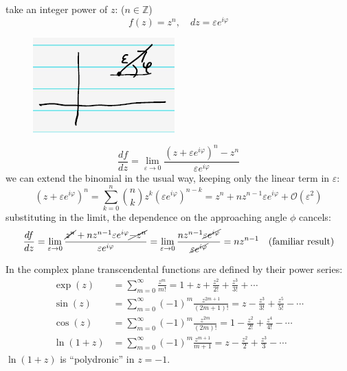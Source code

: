 \documentclass{article}
\begin{document}
\noindent
take an integer power of $z$: ($n \in \mathbb{Z}$)
\begin{equation}
    f(z) = z^n , \quad dz = \varepsilon e^{i \varphi}
\end{equation}
\begin{figure}[h]
    \centering
    \includegraphics[width=0.25\linewidth]{fig11.png}
\end{figure}
\begin{equation}
    \frac{d f}{d z}
= \lim_{\varepsilon \to 0} \frac{(z + \varepsilon e^{i\varphi})^n - z^n}{\varepsilon e^{i\varphi}}
\end{equation}
we can extend the binomial in the usual way, keeping only the linear term in $\varepsilon$:
\begin{equation}
    \left( z + \varepsilon e^{i\varphi} \right)^n
= \sum_{k=0}^{n} \binom{n}{k} z^k \left( \varepsilon e^{i\varphi} \right)^{n - k}
= z^n + n z^{n-1} \varepsilon e^{i\varphi} + \mathcal{O}(\varepsilon^2)
\end{equation}
substituting in the limit, the dependence on the approaching angle $\phi$ cancels:
\begin{equation}
    \frac{d f}{d z}
= \lim_{\varepsilon \to 0} \frac{\cancel{z^n} + n z^{n-1} \varepsilon e^{i\varphi} \cancel{- z^n}}{\varepsilon e^{i\varphi}}
= \lim_{\varepsilon \to 0} \frac{n z^{n-1} \cancel{\varepsilon e^{i\varphi}}}{\cancel{\varepsilon e^{i\varphi}}}
= n z^{n-1} \quad (\text{familiar result})
\end{equation}
\newpage

\noindent
In the complex plane transcendental functions are defined by their power series:
\begin{align}
    \exp(z) &= \sum_{m=0}^{\infty} \frac{z^m}{m!}
= 1 + z + \frac{z^2}{2!} + \frac{z^3}{3!} + \cdots\\
\sin(z) &= \sum_{m=0}^{\infty} (-1)^m \frac{z^{2m+1}}{(2m+1)!}
= z - \frac{z^3}{3!} + \frac{z^5}{5!} - \cdots\\
\cos(z) &= \sum_{m=0}^{\infty} (-1)^m \frac{z^{2m}}{(2m)!}
= 1 - \frac{z^2}{2!} + \frac{z^4}{4!} - \cdots\\
\ln(1+z) &= \sum_{m=0}^{\infty} (-1)^m \frac{z^{m+1}}{m+1}
= z - \frac{z^2}{2} + \frac{z^3}{3} - \cdots
\end{align}
$\ln (1+z)$ is ``polydronic'' in $z=-1$.
\end{document}
